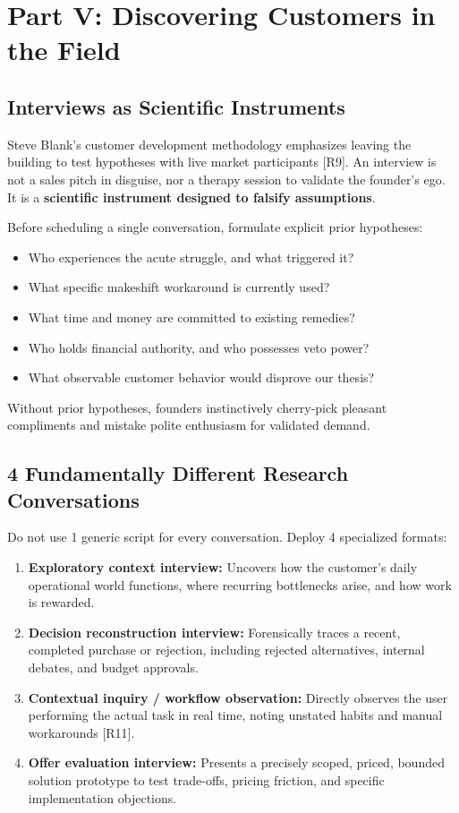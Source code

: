 \section{Part V: Discovering Customers in the Field}

\subsection{Interviews as Scientific Instruments}

Steve Blank's customer development methodology emphasizes leaving the building to test hypotheses with live market participants [R9]. An interview is not a sales pitch in disguise, nor a therapy session to validate the founder's ego. It is a \textbf{scientific instrument designed to falsify assumptions}.

Before scheduling a single conversation, formulate explicit prior hypotheses:
\begin{itemize}[leftmargin=1.2em,itemsep=0.2ex]
  \item Who experiences the acute struggle, and what triggered it?
  \item What specific makeshift workaround is currently used?
  \item What time and money are committed to existing remedies?
  \item Who holds financial authority, and who possesses veto power?
  \item What observable customer behavior would disprove our thesis?
\end{itemize}
Without prior hypotheses, founders instinctively cherry-pick pleasant compliments and mistake polite enthusiasm for validated demand.

\subsection{4 Fundamentally Different Research Conversations}

Do not use 1 generic script for every conversation. Deploy 4 specialized formats:
\begin{enumerate}[leftmargin=1.2em,itemsep=0.2ex]
  \item \textbf{Exploratory context interview:} Uncovers how the customer's daily operational world functions, where recurring bottlenecks arise, and how work is rewarded.
  \item \textbf{Decision reconstruction interview:} Forensically traces a recent, completed purchase or rejection, including rejected alternatives, internal debates, and budget approvals.
  \item \textbf{Contextual inquiry / workflow observation:} Directly observes the user performing the actual task in real time, noting unstated habits and manual workarounds [R11].
  \item \textbf{Offer evaluation interview:} Presents a precisely scoped, priced, bounded solution prototype to test trade-offs, pricing friction, and specific implementation objections.
\end{enumerate}

